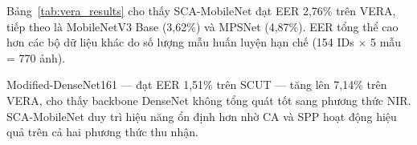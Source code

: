 \documentclass[12pt,a4paper]{article}
\begin{document}
\begin{table}[H]
\caption{So sánh hiệu năng trên bộ dữ liệu VERA Palmvein (giao thức Open-Set, 66 định danh kiểm thử). $\dagger$: mã nguồn công khai, $\ddagger$: tự cài đặt lại.}
\begin{center}
\label{tab:vera_results}
\end{center}
\end{table}

Bảng~\ref{tab:vera_results} cho thấy SCA-MobileNet đạt EER 2,76\% trên VERA, tiếp theo là MobileNetV3 Base (3,62\%) và MPSNet (4,87\%). EER tổng thể cao hơn các bộ dữ liệu khác do số lượng mẫu huấn luyện hạn chế (154 IDs $\times$ 5 mẫu = 770 ảnh).

Modified-DenseNet161 --- đạt EER 1,51\% trên SCUT --- tăng lên 7,14\% trên VERA, cho thấy backbone DenseNet không tổng quát tốt sang phương thức NIR. SCA-MobileNet duy trì hiệu năng ổn định hơn nhờ CA và SPP hoạt động hiệu quả trên cả hai phương thức thu nhận.
\end{document}
